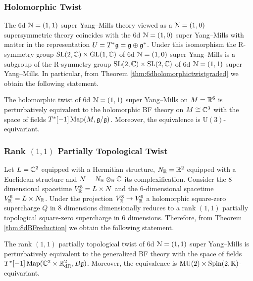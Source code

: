\documentclass[10pt, oneside]{article}
\newcommand{\MU}{\mathrm{MU}}
\renewcommand{\U}{\mathrm{U}}
\begin{document}
\subsubsection{Holomorphic Twist}
\label{sect:6d11holomorphictwist}

The 6d $\mathcal N=(1, 1)$ super Yang--Mills theory viewed as a $\mathcal N=(1, 0)$ supersymmetric theory coincides with the 6d $\mathcal N=(1, 0)$ super Yang--Mills with matter in the representation $U=T^*\mathfrak g=\mathfrak g\oplus \mathfrak g^*$. Under this isomorphism the R-symmetry group $\mathrm{SL}(2, \mathbb C)\times \mathrm{GL}(1, \mathbb C)$ of 6d $\mathcal N=(1, 0)$ super Yang--Mills is a subgroup of the R-symmetry group $\mathrm{SL}(2, \mathbb C)\times \mathrm{SL}(2, \mathbb C)$ of 6d $\mathcal N=(1, 1)$ super Yang--Mills. In particular, from Theorem \ref{thm:6dholomorphictwistgraded} we obtain the following statement.

\begin{theorem}
The holomorphic twist of 6d $\mathcal N=(1, 1)$ super Yang--Mills on $M=\mathbb R^6$ is perturbatively equivalent to the holomorphic BF theory on $M\cong \mathbb C^3$ with the space of fields $T^*[-1]\operatorname{Map}(M, \mathfrak g/\mathfrak g)$. Moreover, the equivalence is $\U(3)$-equivariant.
\label{thm:6d11holomorphictwist}
\end{theorem}

\subsubsection{Rank \texorpdfstring{$(1, 1)$}{(1,1)} Partially Topological Twist}
\label{sect:6d11partialtwist}

Let $L=\mathbb C^2$ equipped with a Hermitian structure, $N_\mathbb R=\mathbb R^2$ equipped with a Euclidean structure and $N=N_\mathbb R\otimes_\mathbb R\mathbb C$ its complexification. Consider the 8-dimensional spacetime $V^8_\mathbb R=L\times N$ and the 6-dimensional spacetime $V^6_\mathbb R=L\times N_\mathbb R$. Under the projection $V^8_\mathbb R\rightarrow V^6_\mathbb R$ a holomorphic square-zero supercharge $Q$ in 8 dimensions dimensionally reduces to a rank $(1, 1)$ partially topological square-zero supercharge in 6 dimensions. Therefore, from Theorem \ref{thm:8dBFreduction} we obtain the following statement.

\begin{theorem}
The rank $(1, 1)$ partially topological twist of 6d $\mathcal N=(1, 1)$ super Yang--Mills is perturbatively equivalent to the generalized BF theory with the space of fields $T^*[-1]\operatorname{Map}(\mathbb C^2\times \mathbb R^2_{\mathrm{dR}}, B\mathfrak g)$. Moreover, the equivalence is $\MU(2)\times\Spin(2, \RR)$-equivariant.
\end{theorem}
\end{document}
